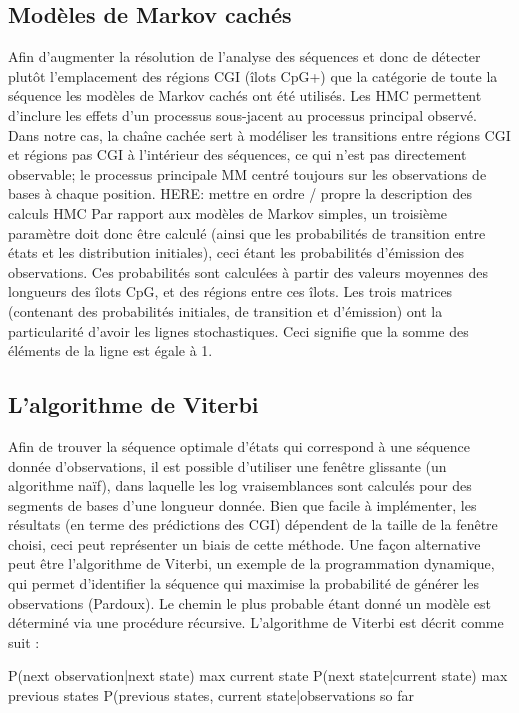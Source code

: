 \documentclass[10pt,a4paper,notitlepage,colorinlistoftodos]{article}
\begin{document}
\begin{multicols}{2}

\subsection{Modèles de Markov cachés}
Afin d’augmenter la résolution de l’analyse des séquences et donc de détecter plutôt l’emplacement des régions CGI (îlots CpG+) que la catégorie de toute la séquence les modèles de Markov cachés ont été utilisés. Les HMC permettent d’inclure les effets d’un processus sous-jacent au processus principal observé. Dans notre cas, la chaîne cachée sert à modéliser les transitions entre régions CGI et régions pas CGI à l’intérieur des séquences, ce qui n’est pas directement observable; le processus principale MM  centré toujours sur les observations de bases à chaque position.
HERE: mettre en ordre / propre la description des calculs HMC 
 Par rapport aux modèles de Markov simples, un troisième paramètre doit donc être calculé (ainsi que les probabilités de transition entre états et les distribution initiales), ceci étant les probabilités d’émission des observations. Ces probabilités sont calculées à partir des
valeurs moyennes des longueurs des îlots CpG, et des régions entre ces îlots. Les trois matrices (contenant des probabilités initiales, de transition et d'émission) ont la particularité d’avoir les lignes stochastiques. Ceci signifie que la somme des éléments de la ligne est égale à 1.

\subsection{L’algorithme de Viterbi}
Afin de trouver la séquence optimale d’états qui correspond à une séquence donnée d’observations, il est possible d’utiliser une fenêtre glissante (un algorithme naïf), dans laquelle les log vraisemblances sont calculés pour des segments de bases d’une longueur donnée. Bien que facile à implémenter, les résultats (en terme des prédictions des CGI) dépendent de la taille de la fenêtre choisi, ceci peut représenter un biais de cette méthode.  Une façon alternative peut être l’algorithme de Viterbi, un exemple de la programmation dynamique, qui permet d’identifier la séquence qui maximise la probabilité de générer les observations  (Pardoux). Le chemin le plus probable étant donné un modèle est déterminé via une procédure récursive. L’algorithme de Viterbi est décrit comme suit :

 P(next observation|next state)  max current state P(next state|current state) max previous states P(previous states, current state|observations so far


\end{multicols}
\end{document}
